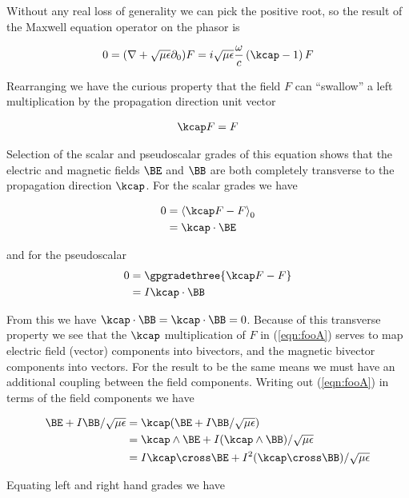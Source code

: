 Without any real loss of generality we can pick the positive root, so the result of the Maxwell equation operator on the phasor is

\begin{align}\label{eqn:foo5}
0 = (\grad + \sqrt{\mu\epsilon}\partial_0) F = i \sqrt{\mu\epsilon}\frac{\omega}{c} \left( \kcap - 1\right) F 
\end{align}

Rearranging we have the curious property that the field $F$ can ``swallow'' a left multiplication by the propagation direction unit vector 

\begin{align}\label{eqn:fooA}
\kcap F = F 
\end{align}

Selection of the scalar and pseudoscalar grades of this equation shows that the electric and magnetic fields $\BE$ and $\BB$ are both completely transverse to the propagation direction $\kcap$.  For the scalar grades we have

\begin{align*}
0 &= \gpgradezero{\kcap F - F} \\
  &= \kcap \cdot \BE
\end{align*}

and for the pseudoscalar
\begin{align*}
0 &= \gpgradethree{\kcap F - F} \\
  &= I \kcap \cdot \BB
\end{align*}

From this we have $\kcap \cdot \BB = \kcap \cdot \BB = 0$.  Because of this transverse property we see that the $\kcap$ multiplication of $F$ in (\ref{eqn:fooA}) serves to map electric field (vector) components into bivectors, and the magnetic bivector components into vectors.  For the result to be the same means we must have an additional coupling between the field components.  Writing out (\ref{eqn:fooA}) in terms of the field components we have

\begin{align*}
\BE + I\BB/\sqrt{\mu\epsilon} 
&= \kcap (\BE + I\BB/\sqrt{\mu\epsilon} ) \\
&= \kcap \wedge \BE + I (\kcap \wedge \BB)/\sqrt{\mu\epsilon}  \\
&= I \kcap \cross \BE + I^2 (\kcap \cross \BB)/\sqrt{\mu\epsilon} 
\end{align*}

Equating left and right hand grades we have

